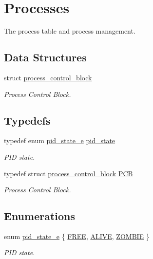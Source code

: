\hypertarget{group__proc}{}\section{Processes}
\label{group__proc}


The process table and process management.  


\subsection*{Data Structures}
\begin{DoxyCompactItemize}
\item 
struct \hyperlink{structprocess__control__block}{process\+\_\+control\+\_\+block}
\begin{DoxyCompactList}\small\item\em Process Control Block. \end{DoxyCompactList}\end{DoxyCompactItemize}
\subsection*{Typedefs}
\begin{DoxyCompactItemize}
\item 
typedef enum \hyperlink{group__proc_ga4f133ac5f9b2ca9c1446889baee1dc05}{pid\+\_\+state\+\_\+e} \hyperlink{group__proc_gade1eea4d20492c4c97263201145e5097}{pid\+\_\+state}
\begin{DoxyCompactList}\small\item\em P\+ID state. \end{DoxyCompactList}\item 
typedef struct \hyperlink{structprocess__control__block}{process\+\_\+control\+\_\+block} \hyperlink{group__proc_gadf327f09ee935cf1734c14e8849f0421}{P\+CB}
\begin{DoxyCompactList}\small\item\em Process Control Block. \end{DoxyCompactList}\end{DoxyCompactItemize}
\subsection*{Enumerations}
\begin{DoxyCompactItemize}
\item 
enum \hyperlink{group__proc_ga4f133ac5f9b2ca9c1446889baee1dc05}{pid\+\_\+state\+\_\+e} \{ \hyperlink{group__proc_gga4f133ac5f9b2ca9c1446889baee1dc05acc62d1576546f3245237e1b232d838b6}{F\+R\+EE}, 
\hyperlink{group__proc_gga4f133ac5f9b2ca9c1446889baee1dc05a4f34c5c191d6e0d028ca831b6c0b1571}{A\+L\+I\+VE}, 
\hyperlink{group__proc_gga4f133ac5f9b2ca9c1446889baee1dc05a5dfb36109b24f39d54d5c3f48f53def8}{Z\+O\+M\+B\+IE}
 \}\begin{DoxyCompactList}\small\item\em P\+ID state. \end{DoxyCompactList}
\end{DoxyCompactItemize}
